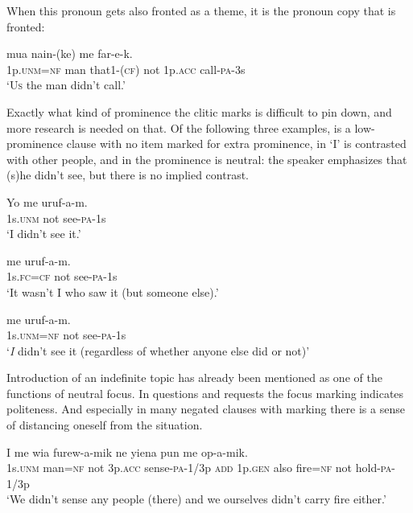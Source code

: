 When this pronoun gets also fronted as a theme, it is the pronoun copy that is fronted:

\ea%
\label{ex:9:x1744}
\gll {}  mua  nain-(ke)  me    far-e-k. \\
1p.\textsc{unm}=\textsc{nf}  man  that1-(\textsc{cf})  not  1p.\textsc{acc}  call-\textsc{pa}-3s      \\
\glt`\textsc{\textsc{Us}}  the man didn't call.'
\z


Exactly what kind of prominence the  clitic marks is difficult to pin down, and more research is needed on that. Of the following three examples,  is a low-prominence clause with no item marked for extra prominence, in  `I' is contrasted with other people, and in  the prominence is neutral: the speaker emphasizes that (s)he didn't see, but there is no implied contrast. 

\ea%
\label{ex:9:x1734}
\gll Yo  me  uruf-a-m. \\
1s.\textsc{unm}  not  see-\textsc{pa}-1s      \\
\glt`I didn't see it.'
\z


\ea%
\label{ex:9:x1735}
\gll {}  me  uruf-a-m. \\
1s.\textsc{fc}=\textsc{cf}  not  see-\textsc{pa}-1s      \\
\glt`It wasn't I who saw it (but someone else).'
\z


\ea%
\label{ex:9:x1736}
\gll {}  me  uruf-a-m. \\
1s.\textsc{unm}=\textsc{nf}  not  see-\textsc{pa}-1s      \\
\glt`\textit{I}  didn't see it (regardless of whether anyone else did or not)'
\z


Introduction of an indefinite topic has already been mentioned as one of the functions of neutral focus. In questions and requests the focus marking indicates politeness. And especially in many negated clauses with  marking there is a sense of distancing oneself from the situation. 

\ea%
\label{ex:9:x1738}
\gll I    me  wia  furew-a-mik  ne  yiena  pun   me  op-a-mik. \\
1s.\textsc{unm}  man=\textsc{nf}  not  3p.\textsc{acc}  sense-\textsc{pa}-1/3p  \textsc{add}  1p.\textsc{gen}  also fire=\textsc{nf}  not  hold-\textsc{pa}-1/3p     \\
\glt`We didn't sense any people (there) and we ourselves didn't carry fire either.'
\z


